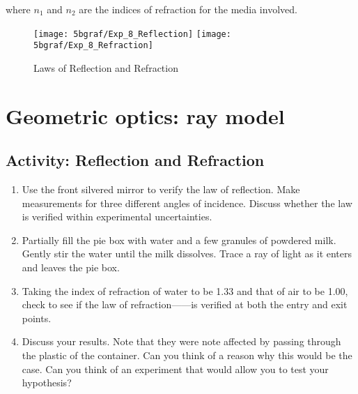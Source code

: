 where $n_1$ and $n_2$ are the indices of refraction for the media involved.  


\begin{figure*} \centering
	\texttt{[image: 5bgraf/Exp\_8\_Reflection]}
	\hfill
	\texttt{[image: 5bgraf/Exp\_8\_Refraction]}
 \caption{Laws of Reflection and Refraction}\label{f:rfract}
\end{figure*}
\FloatBarrier

\section{Geometric optics: ray model}

\subsection{Activity: Reflection and Refraction}
\begin{enumerate}
	\item Use the front silvered mirror to verify the law of reflection.  Make measurements for three different angles of incidence.  Discuss whether the law is verified within experimental uncertainties.

	\item Partially fill the pie box with water and a few granules of powdered milk.  Gently stir the water until the milk dissolves.  Trace a ray of light as it enters and leaves the pie box.  
	\item Taking the index of refraction of water to be 1.33
	and that of air to be 1.00, check to see if the law of refraction------is verified at both the entry and exit points.  
	\item Discuss your results. Note that they were note affected by passing through the plastic of the container.  Can you think of a reason why this would be the case.  Can you think of an experiment that would allow you to test your hypothesis?
\end{enumerate}
	
